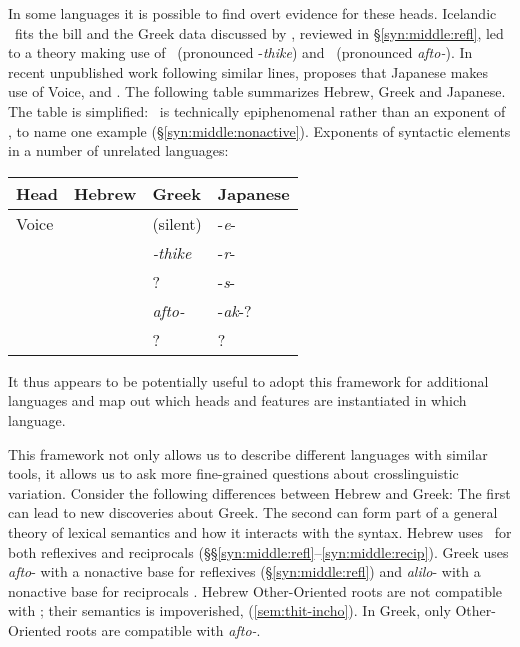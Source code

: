 In some languages it is possible to find overt evidence for these heads. Icelandic \vz~fits the bill \citep{wood15springer} and the Greek data discussed by \cite{spathasetal15}, reviewed in \S\ref{syn:middle:refl}, led to a theory making use of \vz~(pronounced -\emph{thike}) and \va~(pronounced \emph{afto-}). In recent {unpublished }work following similar lines, \cite{oseki16nyu} proposes that Japanese makes use of Voice, {\vz} and \vd. The following table summarizes Hebrew, Greek and Japanese. The table is simplified: \tnif~is technically epiphenomenal rather than an exponent of \vz, to name one example{ (\S\ref{syn:middle:nonactive})}.
\ex\label{ex:heads-langs}Exponents of syntactic elements in a number of unrelated languages:\\
	\begin{tabular}{l|lll}
	Head 	& Hebrew 		& Greek  		& Japanese\\\hline
	Voice   & \tkal     & (silent)      & -\emph{e}-\\
	{\vz} 	& \tnif 	& \emph{-thike}	& -\emph{r}-\\
	{\vd}	& \thif		& ?		& -\emph{s}-\\
	{\va}	& \tpie		& \emph{afto-}	& -\emph{ak}-?\\
	{\pz}	& \tnif		& ?		& ?\\
	\end{tabular}
\xe
It thus appears to be potentially useful to adopt this framework for additional languages and map out which heads and features are instantiated in which language.

This framework not only allows us to describe different languages with similar tools, it allows us to ask more fine-grained questions about crosslinguistic variation. Consider the following differences between Hebrew and Greek: The first can lead to new discoveries about Greek. The second can form part of a general theory of lexical semantics and how it interacts with the syntax.
\pex
	\a Hebrew uses \thit~for both reflexives and reciprocals (\S\S\ref{syn:middle:refl}--\ref{syn:middle:recip}). Greek uses \emph{afto}- with a nonactive base for reflexives (\S\ref{syn:middle:refl}) and \emph{alilo}- with a nonactive base for reciprocals \citep{alexiadouafto}.
	\a Hebrew Other-Oriented roots are not compatible with \va; their semantics is impoverished, (\ref{sem:thit-incho}). In Greek, only Other-Oriented roots are compatible with \emph{afto-}.
\xe

